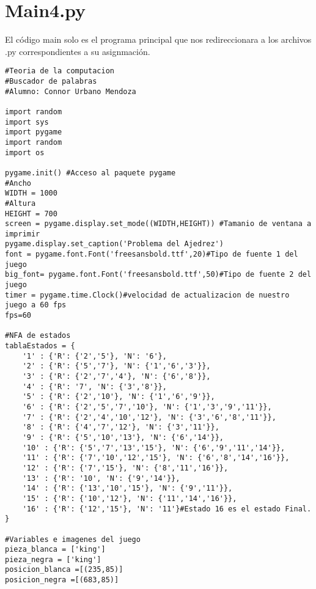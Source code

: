 \section{Main4.py}
El código main solo es el programa principal que nos redireccionara a los archivos .py correspondientes a su asignmación. \newline
\\
\begin{lstlisting}
#Teoria de la computacion
#Buscador de palabras
#Alumno: Connor Urbano Mendoza

import random
import sys
import pygame
import random
import os

pygame.init() #Acceso al paquete pygame
#Ancho
WIDTH = 1000
#Altura
HEIGHT = 700
screen = pygame.display.set_mode((WIDTH,HEIGHT)) #Tamanio de ventana a imprimir
pygame.display.set_caption('Problema del Ajedrez')
font = pygame.font.Font('freesansbold.ttf',20)#Tipo de fuente 1 del juego
big_font= pygame.font.Font('freesansbold.ttf',50)#Tipo de fuente 2 del juego
timer = pygame.time.Clock()#velocidad de actualizacion de nuestro juego a 60 fps
fps=60

#NFA de estados
tablaEstados = {
    '1' : {'R': {'2','5'}, 'N': '6'},
    '2' : {'R': {'5','7'}, 'N': {'1','6','3'}},
    '3' : {'R': {'2','7','4'}, 'N': {'6','8'}},
    '4' : {'R': '7', 'N': {'3','8'}},
    '5' : {'R': {'2','10'}, 'N': {'1','6','9'}},
    '6' : {'R': {'2','5','7','10'}, 'N': {'1','3','9','11'}},
    '7' : {'R': {'2','4','10','12'}, 'N': {'3','6','8','11'}},
    '8' : {'R': {'4','7','12'}, 'N': {'3','11'}},
    '9' : {'R': {'5','10','13'}, 'N': {'6','14'}},
    '10' : {'R': {'5','7','13','15'}, 'N': {'6','9','11','14'}},
    '11' : {'R': {'7','10','12','15'}, 'N': {'6','8','14','16'}},
    '12' : {'R': {'7','15'}, 'N': {'8','11','16'}},
    '13' : {'R': '10', 'N': {'9','14'}},
    '14' : {'R': {'13','10','15'}, 'N': {'9','11'}},
    '15' : {'R': {'10','12'}, 'N': {'11','14','16'}},
    '16' : {'R': {'12','15'}, 'N': '11'}#Estado 16 es el estado Final.
}

#Variables e imagenes del juego
pieza_blanca = ['king']
pieza_negra = ['king']
posicion_blanca =[(235,85)]
posicion_negra =[(683,85)]


\end{lstlisting}
